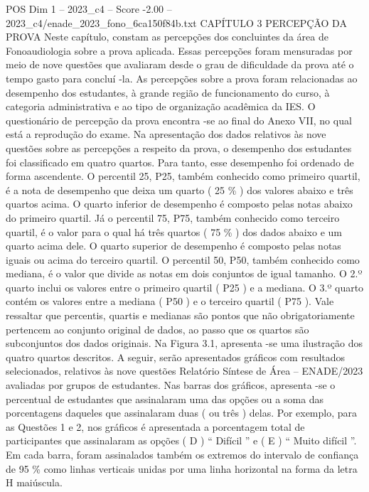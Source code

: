 \begin{textsample}{POS Dim 1 – 2023\_c4 – Score -2.00 – 2023\_c4/enade\_2023\_fono\_6ca150f84b.txt}  \label{ex:f1_pos_200}
CAPÍTULO 3 PERCEPÇÃO DA PROVA Neste capítulo, constam as percepções dos concluintes da área de Fonoaudiologia sobre a prova aplicada.
Essas percepções foram mensuradas por meio de nove questões que avaliaram desde o grau de dificuldade da prova até o tempo gasto para concluí -la.
As percepções sobre a prova foram relacionadas ao desempenho dos estudantes, à grande região de funcionamento do curso, à categoria administrativa e ao tipo de organização acadêmica da IES.
O questionário de percepção da prova encontra -se ao final do Anexo VII, no qual está a reprodução do exame.
Na apresentação dos dados relativos às nove questões sobre as percepções a respeito da prova, o desempenho dos estudantes foi classificado em quatro quartos.
Para tanto, esse desempenho foi ordenado de forma ascendente.
O percentil 25, P25, também conhecido como primeiro quartil, é a nota de desempenho que deixa um quarto ( 25 \% ) dos valores abaixo e três quartos acima.
O quarto inferior de desempenho é composto pelas notas abaixo do primeiro quartil.
Já o percentil 75, P75, também conhecido como terceiro quartil, é o valor para o qual há três quartos ( 75 \% ) dos dados abaixo e um quarto acima dele.
O quarto superior de desempenho é composto pelas notas iguais ou acima do terceiro quartil.
O percentil 50, P50, também conhecido como mediana, é o valor que divide as notas em dois conjuntos de igual tamanho.
O 2.º quarto inclui os valores entre o primeiro quartil ( P25 ) e a mediana.
O 3.º quarto contém os valores entre a mediana ( P50 ) e o terceiro quartil ( P75 ).
Vale ressaltar que percentis, quartis e medianas são pontos que não obrigatoriamente pertencem ao conjunto original de dados, ao passo que os quartos são subconjuntos dos dados originais.
Na Figura 3.1, apresenta -se uma ilustração dos quatro quartos descritos.
A seguir, serão apresentados gráficos com resultados selecionados, relativos às nove questões Relatório Síntese de Área – ENADE/2023 avaliadas por grupos de estudantes.
Nas barras dos gráficos, apresenta -se o percentual de estudantes que assinalaram uma das opções ou a soma das porcentagens daqueles que assinalaram duas ( ou três ) delas.
Por exemplo, para as Questões 1 e 2, nos gráficos é apresentada a porcentagem total de participantes que assinalaram as opções ( D ) “ Difícil ” e ( E ) “ Muito difícil ”.
Em cada barra, foram assinalados também os extremos do intervalo de confiança de 95 \% como linhas verticais unidas por uma linha horizontal na forma da letra H maiúscula.

\end{textsample}
